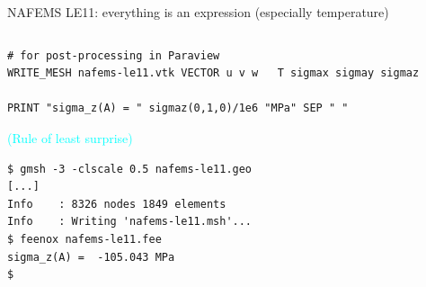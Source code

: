 \documentclass[
  ignorenonframetext,
  aspectratio=169,
]{beamer}
\begin{document}
\begin{frame}[fragile]{NAFEMS LE11: everything is an expression
(especially temperature)}
\begin{columns}[T]
\begin{column}{0.5\textwidth}
\begin{lstlisting}[style=feenox]
# for post-processing in Paraview
WRITE_MESH nafems-le11.vtk VECTOR u v w   T sigmax sigmay sigmaz

PRINT "sigma_z(A) = " sigmaz(0,1,0)/1e6 "MPa" SEP " "
\end{lstlisting}

\vspace{-0.25cm}\hfill{\footnotesize\textcolor{cyan}{(Rule of {least surprise})}}

\begin{lstlisting}[style=terminal]
$ gmsh -3 -clscale 0.5 nafems-le11.geo
[...]
Info    : 8326 nodes 1849 elements
Info    : Writing 'nafems-le11.msh'...
$ feenox nafems-le11.fee 
sigma_z(A) =  -105.043 MPa
$
\end{lstlisting}
\end{column}
\end{columns}
\end{frame}
\end{document}
